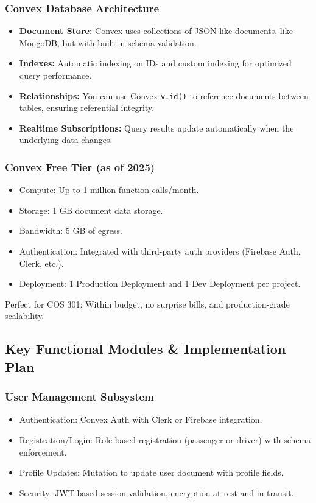 \documentclass[a4paper,12pt]{article}
\begin{document}
\subsubsection*{Convex Database Architecture}
\begin{itemize}
    \item \textbf{Document Store:} Convex uses collections of JSON-like documents, like MongoDB, but with built-in schema validation.
    \item \textbf{Indexes:} Automatic indexing on IDs and custom indexing for optimized query performance.
    \item \textbf{Relationships:} You can use Convex \texttt{v.id()} to reference documents between tables, ensuring referential integrity.
    \item \textbf{Realtime Subscriptions:} Query results update automatically when the underlying data changes.
\end{itemize}

\subsubsection*{Convex Free Tier (as of 2025)}
\begin{itemize}
    \item Compute: Up to 1 million function calls/month.
    \item Storage: 1 GB document data storage.
    \item Bandwidth: 5 GB of egress.
    \item Authentication: Integrated with third-party auth providers (Firebase Auth, Clerk, etc.).
    \item Deployment: 1 Production Deployment and 1 Dev Deployment per project.
\end{itemize}

\noindent Perfect for COS 301: Within budget, no surprise bills, and production-grade scalability.

\subsection{Key Functional Modules \& Implementation Plan}

\subsubsection*{User Management Subsystem}
\begin{itemize}
    \item Authentication: Convex Auth with Clerk or Firebase integration.
    \item Registration/Login: Role-based registration (passenger or driver) with schema enforcement.
    \item Profile Updates: Mutation to update user document with profile fields.
    \item Security: JWT-based session validation, encryption at rest and in transit.
\end{itemize}
\end{document}
